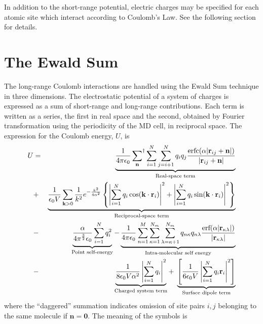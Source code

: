 \documentclass[a4paper,twoside]{report}
\providecommand{\bm}[1]{\mathbf{#1}}
\newcommand{\erf}{\mbox{erf}}
\newcommand{\erfc}{\mbox{erfc}}
\begin{document}
In addition to the short-range potential, electric charges may be
specified for each atomic site which interact according to Coulomb's
Law.  See the following section for details.

\section{The Ewald Sum}%
\label{sec:ewald}
The long-range Coulomb interactions are handled using the Ewald Sum
technique in three dimensions\cite[p.\ 156]{berthaut:52,allen:87}.
The electrostatic potential of a system of charges is expressed as a
sum of short-range and long-range contributions.  Each term is written
as a series, the first in real space and the second, obtained by
Fourier transformation using the periodicity of the MD cell, in
reciprocal space.  The expression for the Coulomb energy, $U$, is
\begin{eqnarray}
\label{eqn:ewald}
U & = &  \underbrace{\frac{1}{4 \pi \epsilon_0}
\sideset{}{^\dag}\sum_{\bm{n}} \sum_{i=1}^{N} \sum_{j=i+1}^{N} q_iq_j
\frac{\erfc( \alpha | \bm{r}_{ij} +  \bm{n} |)}{| \bm{r}_{ij} +
\bm{n} | }}_{\textnormal{Real-space term}} 
\nonumber \\
 & + & \underbrace{\frac{1}{\epsilon_0 V} \sum_{\bm{k} > 0} \frac{1}{k^2}
       e^{-\frac{k^2}{4 \alpha^2}} 
\left \lbrace 
\left | \sum_{i=1}^{N} q_i \cos(\bm{k \cdot r}_i) \right |^2 + 
\left | \sum_{i=1}^{N} q_i \sin(\bm{k \cdot r}_i) \right |^2 
\right \rbrace}_{\textnormal{Reciprocal-space term}}\\
 & - & 
\underbrace{\frac{\alpha}{4 \pi^\frac{3}{2} \epsilon_0} 
\sum_{i=1}^{N} q_i^2}_{\textnormal{Point self-energy}} 
 - \underbrace{\frac{1}{4 \pi \epsilon_0} \sum_{n=1}^M
\sum_{\kappa=1}^{N_m} \sum_{\lambda=\kappa+1}^{N_m} q_{n\kappa} q_{n\lambda}
\frac{\erf( \alpha | \bm{r}_{\kappa\lambda} |)}{|
\bm{r}_{\kappa\lambda}| }}_{\textnormal{Intra-molecular self energy}}
\nonumber \\
& - & \underbrace{ \frac{1}{8 \epsilon_0 V \alpha^2}
                    \left | \sum_{i=1}^N q_i 
                    \right |^2}_{\textnormal{Charged system term}} +
\; \underbrace{\left [  \frac{1}{6 \epsilon_0 V} 
                    \left | \sum_{i=1}^N q_i \bm{r}_i 
                    \right |^2 \right ]}_{\textnormal{Surface dipole term}}
\nonumber
\end{eqnarray}
where the ``daggered'' summation indicates omission of site pairs $i,
j$ belonging to the same molecule if $\bm{n}=\bm{0}$.  The meaning of
the symbols is
\end{document}
